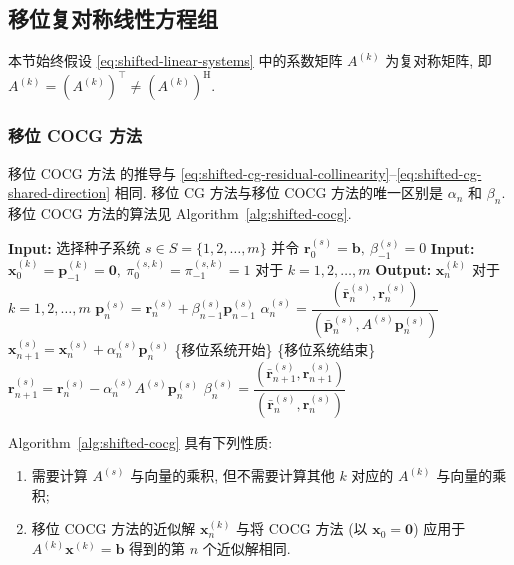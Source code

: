 \subsection{{移位复对称线性方程组}}\label{sec:shifted-complex-symmetric-systems}
{本节始终假设 \eqref{eq:shifted-linear-systems} 中的系数矩阵 $A^{(k)}$ 为复对称矩阵, 即 $A^{(k)}=(A^{(k)})^{\top}\ne(A^{(k)})^{\mathrm H}$.}
\subsubsection{{移位 COCG 方法}}\label{subsec:shifted-cocg}
{移位 COCG 方法  的推导与 \eqref{eq:shifted-cg-residual-collinearity}--\eqref{eq:shifted-cg-shared-direction} 相同. 移位 CG 方法与移位 COCG 方法的唯一区别是 $\alpha_n$ 和 $\beta_n$. 移位 COCG 方法的算法见 Algorithm\ \ref{alg:shifted-cocg}.}
\begin{algorithm}[H]\caption{{移位 COCG 方法 (注意: $(\bar{\bm a},\bm b)=\bm a^{\top}\bm b$)}}\label{alg:shifted-cocg}\begin{algorithmic}[1]
\Statex\textbf{Input:} {选择种子系统 $s\in S=\{1,2,\ldots,m\}$ 并令 $\bm r_0^{(s)}=\bm b,\ \beta_{-1}^{(s)}=0$}
\Statex\textbf{Input:} $\bm x_0^{(k)}=\bm p_{-1}^{(k)}=\bm0,\ \pi_0^{(s,k)}=\pi_{-1}^{(s,k)}=1$ {对于} $k=1,2,\ldots,m$
\Statex\textbf{Output:} $\bm x_n^{(k)}$ {对于} $k=1,2,\ldots,m$
\State $\bm p_n^{(s)}=\bm r_n^{(s)}+\beta_{n-1}^{(s)}\bm p_{n-1}^{(s)}$
\State $\alpha_n^{(s)}=\dfrac{(\bar{\bm r}_n^{(s)},\bm r_n^{(s)})}{(\bar{\bm p}_n^{(s)},A^{(s)}\bm p_n^{(s)})}$
\State $\bm x_{n+1}^{(s)}=\bm x_n^{(s)}+\alpha_n^{(s)}\bm p_n^{(s)}$
\State \{{移位系统开始}\}
\State \{{移位系统结束}\}
\State $\bm r_{n+1}^{(s)}=\bm r_n^{(s)}-\alpha_n^{(s)}A^{(s)}\bm p_n^{(s)}$
\State $\beta_n^{(s)}=\dfrac{(\bar{\bm r}_{n+1}^{(s)},\bm r_{n+1}^{(s)})}{(\bar{\bm r}_n^{(s)},\bm r_n^{(s)})}$
\EndFor\end{algorithmic}\end{algorithm}
{Algorithm\ \ref{alg:shifted-cocg} 具有下列性质:}
\begin{enumerate}
\item {需要计算 $A^{(s)}$ 与向量的乘积, 但不需要计算其他 $k$ 对应的 $A^{(k)}$ 与向量的乘积;}
\item {移位 COCG 方法的近似解 $\bm x_n^{(k)}$ 与将 COCG 方法 (以 $\bm x_0=\bm0$) 应用于 $A^{(k)}\bm x^{(k)}=\bm b$ 得到的第 $n$ 个近似解相同.}
\end{enumerate}
